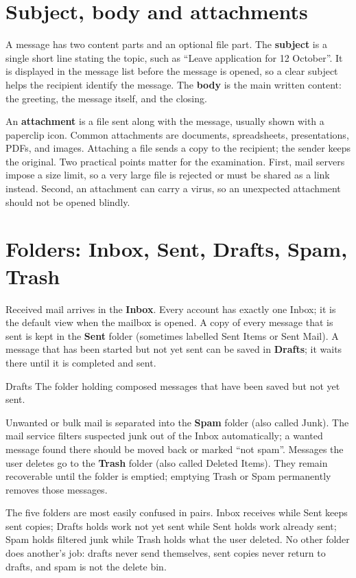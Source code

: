 \section{Subject, body and attachments}
A message has two content parts and an optional file part. The
\textbf{subject} is a single short line stating the topic, such as ``Leave
application for 12 October''. It is displayed in the message list before the
message is opened, so a clear subject helps the recipient identify the
message. The \textbf{body} is the main written content: the greeting, the
message itself, and the closing.

An \textbf{attachment} is a file sent along with the message, usually shown
with a paperclip icon. Common attachments are documents, spreadsheets,
presentations, PDFs, and images. Attaching a file sends a copy to the
recipient; the sender keeps the original. Two practical points matter for the
examination. First, mail servers impose a size limit, so a very large file is
rejected or must be shared as a link instead. Second, an attachment can carry
a virus, so an unexpected attachment should not be opened blindly.

\section{Folders: Inbox, Sent, Drafts, Spam, Trash}
Received mail arrives in the \textbf{Inbox}. Every account has exactly one
Inbox; it is the default view when the mailbox is opened. A copy of every
message that is sent is kept in the \textbf{Sent} folder (sometimes labelled
Sent Items or Sent Mail). A message that has been started but not yet sent can
be saved in \textbf{Drafts}; it waits there until it is completed and sent.

\begin{definitionbox}{Drafts}
The folder holding composed messages that have been saved but not yet sent.
\end{definitionbox}

Unwanted or bulk mail is separated into the \textbf{Spam} folder (also called
Junk). The mail service filters suspected junk out of the Inbox automatically;
a wanted message found there should be moved back or marked ``not spam''.
Messages the user deletes go to the \textbf{Trash} folder (also called Deleted
Items). They remain recoverable until the folder is emptied; emptying Trash
or Spam permanently removes those messages.

The five folders are most easily confused in pairs. Inbox receives while Sent
keeps sent copies; Drafts holds work not yet sent while Sent holds work
already sent; Spam holds filtered junk while Trash holds what the user deleted.
No other folder does another's job: drafts never send themselves, sent copies
never return to drafts, and spam is not the delete bin.

